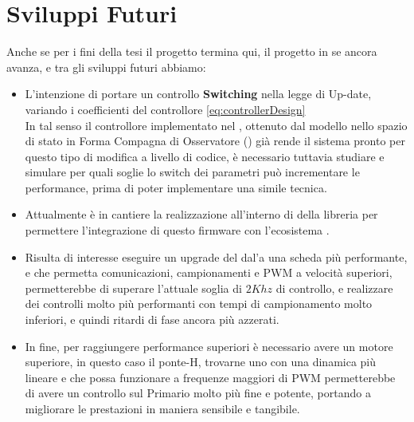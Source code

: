 \section*{Sviluppi Futuri}
Anche se per i fini della tesi il progetto termina qui, il progetto in se ancora avanza, e tra gli sviluppi futuri abbiamo:
\begin{itemize}
	\item L'intenzione di portare un controllo \textbf{Switching} nella legge di Up-date, variando i coefficienti del controllore \ref{eq:controllerDesign}\\
	      In tal senso il controllore implementato nel \microControllore, ottenuto dal modello nello spazio di stato in Forma Compagna di Osservatore (\cite{FormeCanoniche}) già rende il sistema pronto per questo tipo di modifica a livello di codice, è necessario tuttavia studiare e simulare per quali soglie lo switch dei parametri può incrementare le performance, prima di poter implementare una simile tecnica.
	\item Attualmente è in cantiere la realizzazione all'interno di \MARTe della libreria \cite*{EMP} per permettere l'integrazione di questo firmware con l'ecosistema \MARTe.
	\item Risulta di interesse eseguire un upgrade del \microControllore dal'\ArduinoUno a una scheda più performante, e che permetta comunicazioni, campionamenti e PWM a velocità superiori, permetterebbe di superare l'attuale soglia di $ 2Khz $ di controllo, e realizzare dei controlli molto più performanti con tempi di campionamento molto inferiori, e quindi ritardi di fase ancora più azzerati.
	\item In fine, per raggiungere performance superiori è necessario avere un motore superiore, in questo caso il ponte-H, trovarne uno con una dinamica più lineare e che possa funzionare a frequenze maggiori di PWM permetterebbe di avere un controllo sul Primario molto più fine e potente, portando a migliorare le prestazioni in maniera sensibile e tangibile.

\end{itemize}




